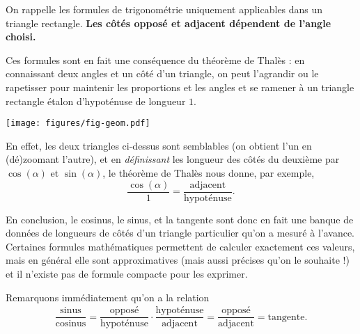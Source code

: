 On rappelle les formules de trigonométrie uniquement applicables dans un triangle rectangle.
\warning\textbf{Les côtés opposé et adjacent dépendent de l'angle choisi.}



Ces formules sont en fait une conséquence du théorème de Thalès : en connaissant deux angles et un côté d'un triangle, on peut l'agrandir ou le rapetisser pour maintenir les proportions et les angles et se ramener à un triangle rectangle étalon d'hypoténuse de longueur $1$.

	\begin{center}
	\texttt{[image: figures/fig-geom.pdf]}
	\end{center}

En effet, les deux triangles ci-dessus sont semblables (on obtient l'un en (dé)zoomant l'autre), et en \emph{définissant} les longueur des côtés du deuxième par $\cos(\alpha)$ et $\sin(\alpha)$, le théorème de Thalès nous donne, par exemple,
	\[ \dfrac{\cos(\alpha)}{1} = \dfrac{\text{adjacent}}{\text{hypoténuse}}. \]

En conclusion, le cosinus, le sinus, et la tangente sont donc en fait une banque de données de longueurs de côtés d'un triangle particulier qu'on a mesuré à l'avance.
Certaines formules mathématiques permettent de calculer exactement ces valeurs, mais en général elle sont approximatives (mais aussi précises qu'on le souhaite !) et il n'existe pas de formule compacte pour les exprimer.

Remarquons immédiatement qu'on a la relation
	\begin{align*}
		\dfrac{\text{sinus}}{\text{cosinus}}
		= \dfrac{\text{opposé}}{\text{hypoténuse}} \cdot \dfrac{\text{hypoténuse}}{\text{adjacent}}
		= \dfrac{\text{opposé}}{\text{adjacent}}
		 = \text{tangente}.
	\end{align*}


